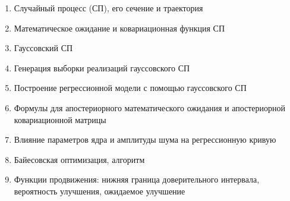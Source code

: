 \documentclass[12pt,oneside,openany]{article}
\begin{document}
\begin{enumerate}
    \item Случайный процесс (СП), его сечение и траектория
    \item Математическое ожидание и ковариационная функция СП
    \item Гауссовский СП
    \item Генерация выборки реализаций гауссовского СП

    \item Построение регрессионной модели с помощью гауссовского СП
    \item Формулы для апостериорного математического ожидания и апостериорной ковариационной матрицы
    \item Влияние параметров ядра и амплитуды шума на регрессионную кривую

    \item Байесовская оптимизация, алгоритм
    \item Функции продвижения: нижняя граница доверительного интервала, вероятность улучшения, ожидаемое улучшение

\end{enumerate}
\end{document}

